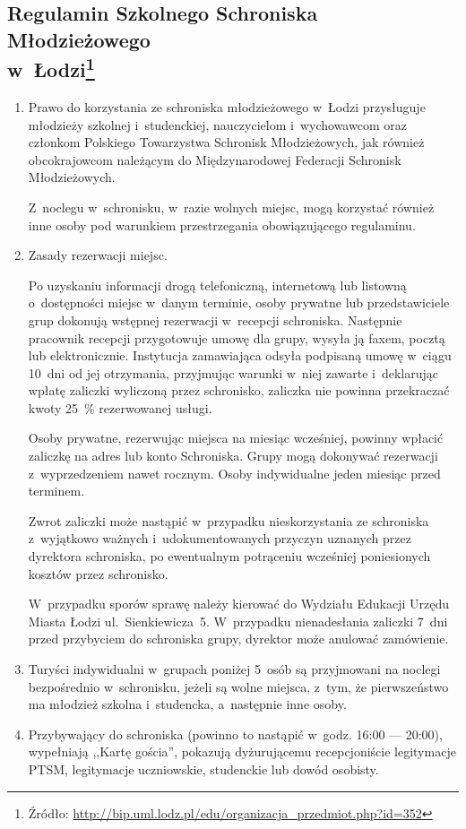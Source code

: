 \subsection[Regulamin Szkolnego Schroniska Młodzieżowego w~Łodzi]{Regulamin Szkolnego Schroniska Młodzieżowego\\w~Łodzi\footnote{Źródło: \href{http://bip.uml.lodz.pl/edu/organizacja\_przedmiot.php?id=352}{http://bip.uml.lodz.pl/edu/organizacja\_przedmiot.php?id=352}}}
\begin{enumerate}\label{regulamin-schroniska}
\item Prawo do korzystania ze schroniska młodzieżowego w~Łodzi przysługuje młodzieży szkolnej i~studenckiej, nauczycielom i~wychowawcom oraz członkom Polskiego Towarzystwa Schronisk Młodzieżowych, jak również obcokrajowcom należącym do Międzynarodowej Federacji Schronisk Młodzieżowych.

Z~noclegu w~schronisku, w~razie wolnych miejsc, mogą korzystać również inne osoby pod warunkiem przestrzegania obowiązującego regulaminu.
\item Zasady rezerwacji miejsc.

Po uzyskaniu informacji drogą telefoniczną, internetową lub listowną o~dostępności miejsc w~danym terminie, osoby prywatne lub przedstawiciele grup dokonują wstępnej rezerwacji w~recepcji schroniska. Następnie pracownik recepcji przygotowuje umowę dla grupy, wysyła ją faxem, pocztą lub elektronicznie. Instytucja zamawiająca odsyła podpisaną umowę w~ciągu 10~dni od jej otrzymania, przyjmując warunki w~niej zawarte i~deklarując wpłatę zaliczki wyliczoną przez schronisko, zaliczka nie powinna przekraczać kwoty 25~\% rezerwowanej usługi.

Osoby prywatne, rezerwując miejsca na miesiąc wcześniej, powinny wpłacić zaliczkę na adres lub konto Schroniska. Grupy mogą dokonywać rezerwacji z~wyprzedzeniem nawet rocznym. Osoby indywidualne jeden miesiąc przed terminem.

Zwrot zaliczki może nastąpić w~przypadku nieskorzystania ze schroniska z~wyjątkowo ważnych i~udokumentowanych przyczyn uznanych przez dyrektora schroniska, po ewentualnym potrąceniu wcześniej poniesionych kosztów przez schronisko.

W~przypadku sporów sprawę należy kierować do Wydziału Edukacji Urzędu Miasta Łodzi ul.~Sienkiewicza~5. W~przypadku nienadesłania zaliczki 7~dni przed przybyciem do schroniska grupy, dyrektor może anulować zamówienie.
\item Turyści indywidualni w~grupach poniżej 5~osób są przyjmowani na noclegi bezpośrednio w~schronisku, jeżeli są wolne miejsca, z~tym, że pierwszeństwo ma młodzież szkolna i~studencka, a~następnie inne osoby.
\item Przybywający do schroniska (powinno to nastąpić w~godz. 16:00 --- 20:00), wypełniają ,,Kartę gościa'', pokazują dyżurującemu recepcjoniście legitymacje PTSM, legitymacje uczniowskie, studenckie lub dowód osobisty.


\end{enumerate}
